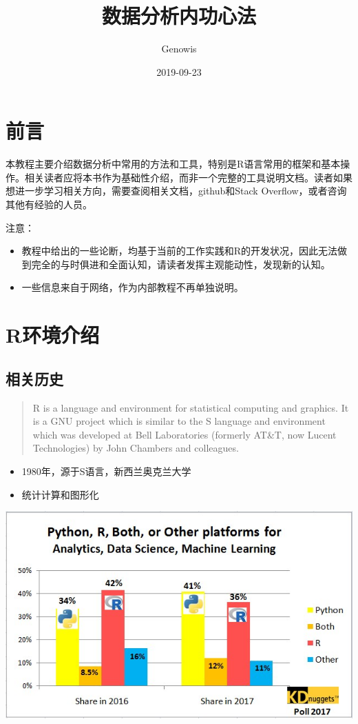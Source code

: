 \documentclass[]{book}
\title{数据分析内功心法}
\author{Genowis}
\date{2019-09-23}
\providecommand{\tightlist}{%
  \setlength{\itemsep}{0pt}\setlength{\parskip}{0pt}}
\begin{document}
\maketitle

{
\setcounter{tocdepth}{1}
\tableofcontents
}
\hypertarget{section}{%
\chapter{前言}\label{section}}

本教程主要介绍数据分析中常用的方法和工具，特别是R语言常用的框架和基本操作。相关读者应将本书作为基础性介绍，而非一个完整的工具说明文档。读者如果想进一步学习相关方向，需要查阅相关文档，github和Stack Overflow，或者咨询其他有经验的人员。

注意：

\begin{itemize}
\tightlist
\item
  教程中给出的一些论断，均基于当前的工作实践和R的开发状况，因此无法做到完全的与时俱进和全面认知，请读者发挥主观能动性，发现新的认知。
\item
  一些信息来自于网络，作为内部教程不再单独说明。
\end{itemize}

\hypertarget{intro}{%
\chapter{R环境介绍}\label{intro}}

\hypertarget{section-1}{%
\section{相关历史}\label{section-1}}

\begin{quote}
R is a language and environment for statistical computing and graphics. It is a GNU project which is similar to the S language and environment which was developed at Bell Laboratories (formerly AT\&T, now Lucent Technologies) by John Chambers and colleagues.
\end{quote}

\begin{itemize}
\tightlist
\item
  1980年，源于S语言，新西兰奥克兰大学
\item
  统计计算和图形化
\end{itemize}

\includegraphics{figures/poll.jpg}
\end{document}
